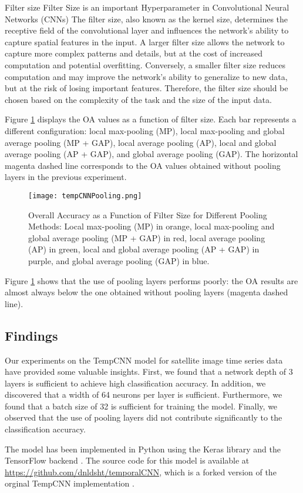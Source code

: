 \begin{paragraph}{Filter size}
Filter Size is an important Hyperparameter in Convolutional Neural Networks (CNNs)
The filter size, also known as the kernel size, determines the receptive field of the convolutional layer and influences the network's ability to capture spatial features in the input.
A larger filter size allows the network to capture more complex patterns and details, but at the cost of increased computation and potential overfitting.
Conversely, a smaller filter size reduces computation and may improve the network's ability to generalize to new data, but at the risk of losing important features.
Therefore, the filter size should be chosen based on the complexity of the task and the size of the input data.
\end{paragraph}



Figure \ref{tab:tempCNNPooling} displays the OA values as a function of filter size. 
Each bar represents a different configuration: local max-pooling (MP), local max-pooling and global average pooling (MP + GAP), local average pooling (AP), local and global average pooling (AP + GAP), and global average pooling (GAP). 
The horizontal magenta dashed line corresponds to the OA values obtained without pooling layers in the previous experiment.


\begin{figure}[H]
  \centering
  \texttt{[image: tempCNNPooling.png]}
  \caption{Overall Accuracy as a Function of Filter Size for Different Pooling Methods: Local max-pooling (MP) in orange, local max-pooling and global average pooling (MP + GAP) in red, local average pooling (AP) in green, local and global average pooling (AP + GAP) in purple, and global average pooling (GAP) in blue.}
  \label{tab:tempCNNPooling}
\end{figure}

Figure \ref{tab:tempCNNPooling} shows that the use of pooling layers performs poorly: the OA results are almost always
below the one obtained without pooling layers (magenta dashed line). 

\subsection{Findings}

Our experiments on the TempCNN model for satellite image time series data have provided some valuable insights. 
First, we found that a network depth of 3 layers is sufficient to achieve high classification accuracy. 
In addition, we discovered that a width of 64 neurons per layer is sufficient. 
Furthermore, we found that a batch size of 32 is sufficient for training the model. 
Finally, we observed that the use of pooling layers did not contribute significantly to the classification accuracy.

The model has been implemented in Python using the Keras library \cite{chollet2015keras} and the TensorFlow backend \cite{tensorflow2015-whitepaper}.
The source code for this model is available at \url{https://github.com/dnldsht/temporalCNN}, which is a forked version of the orginal TempCNN implementation \cite{tempCNN}.